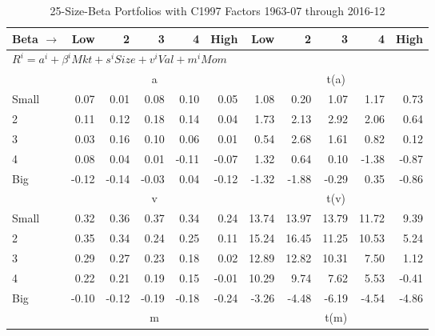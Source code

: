 
\begin{table}[!ht]
\centering
\caption{25-Size-Beta Portfolios with C1997 Factors 1963-07 through 2016-12}
\begin{tabular}{lrrrrrrrrrr}
  \toprule
    Beta $\rightarrow$ & Low & 2 & 3 & 4 & High & Low & 2 & 3 & 4 & High \\ 
  \midrule
  \multicolumn{11}{l}{$R^i=a^i+\beta^iMkt+s^iSize+v^iVal+m^iMom$} \\

  
    
      & \multicolumn{5}{c}{a} & \multicolumn{5}{c}{t(a)}
    
    \\
      \cmidrule(r){2-6} \cmidrule(r){7-11}

    Small   & 0.07  & 0.01  & 0.08  & 0.10  & 0.05  & 1.08  & 0.20  & 1.07  & 1.17  & 0.73  \\
         2  & 0.11  & 0.12  & 0.18  & 0.14  & 0.04  & 1.73  & 2.13  & 2.92  & 2.06  & 0.64  \\
         3  & 0.03  & 0.16  & 0.10  & 0.06  & 0.01  & 0.54  & 2.68  & 1.61  & 0.82  & 0.12  \\
         4  & 0.08  & 0.04  & 0.01  & -0.11  & -0.07  & 1.32  & 0.64  & 0.10  & -1.38  & -0.87  \\
    Big     & -0.12  & -0.14  & -0.03  & 0.04  & -0.12  & -1.32  & -1.88  & -0.29  & 0.35  & -0.86  \\

  
    
      & \multicolumn{5}{c}{v} & \multicolumn{5}{c}{t(v)}
    
    \\
      \cmidrule(r){2-6} \cmidrule(r){7-11}

    Small   & 0.32  & 0.36  & 0.37  & 0.34  & 0.24  & 13.74  & 13.97  & 13.79  & 11.72  & 9.39  \\
         2  & 0.35  & 0.34  & 0.24  & 0.25  & 0.11  & 15.24  & 16.45  & 11.25  & 10.53  & 5.24  \\
         3  & 0.29  & 0.27  & 0.23  & 0.18  & 0.02  & 12.89  & 12.82  & 10.31  & 7.50  & 1.12  \\
         4  & 0.22  & 0.21  & 0.19  & 0.15  & -0.01  & 10.29  & 9.74  & 7.62  & 5.53  & -0.41  \\
    Big     & -0.10  & -0.12  & -0.19  & -0.18  & -0.24  & -3.26  & -4.48  & -6.19  & -4.54  & -4.86  \\

  
    
      & \multicolumn{5}{c}{m} & \multicolumn{5}{c}{t(m)}
    

\end{tabular}
\end{table}
